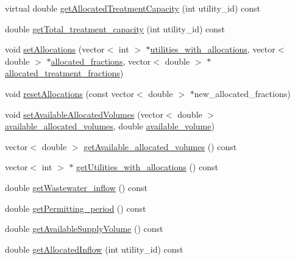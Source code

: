 \begin{DoxyCompactItemize}
\item 
virtual double \mbox{\hyperlink{classWaterSource_ab3ba86d2a3e864e435ba2b88cceea555}{get\+Allocated\+Treatment\+Capacity}} (int utility\+\_\+id) const
\item 
double \mbox{\hyperlink{classWaterSource_a6228c9aee407ca2544753dbd2792c5fb}{get\+Total\+\_\+treatment\+\_\+capacity}} (int utility\+\_\+id) const
\item 
void \mbox{\hyperlink{classWaterSource_ac834762e016e796968ad286feeca7be6}{set\+Allocations}} (vector$<$ int $>$ $\ast$\mbox{\hyperlink{classWaterSource_ac345583fc2d0f7e1db31ee40244d7ace}{utilities\+\_\+with\+\_\+allocations}}, vector$<$ double $>$ $\ast$\mbox{\hyperlink{classWaterSource_a2f6655a80c4847fe039987255d9d998c}{allocated\+\_\+fractions}}, vector$<$ double $>$ $\ast$\mbox{\hyperlink{classWaterSource_aa73fe10cfc6579b2fb79529e1dde5140}{allocated\+\_\+treatment\+\_\+fractions}})
\item 
void \mbox{\hyperlink{classWaterSource_af52f39412f0d761f7e3b3369ffdf90f1}{reset\+Allocations}} (const vector$<$ double $>$ $\ast$new\+\_\+allocated\+\_\+fractions)
\item 
void \mbox{\hyperlink{classWaterSource_ae29ed4aa2b9c97c5a41772daf4631f05}{set\+Available\+Allocated\+Volumes}} (vector$<$ double $>$ \mbox{\hyperlink{classWaterSource_a77d3fe9ea445fc987b07debdfb9e2f5b}{available\+\_\+allocated\+\_\+volumes}}, double \mbox{\hyperlink{classWaterSource_a49e1a191152e344e2161e8db166e067a}{available\+\_\+volume}})
\item 
vector$<$ double $>$ \mbox{\hyperlink{classWaterSource_a1087f5f2458803fd1d37383e303bd25f}{get\+Available\+\_\+allocated\+\_\+volumes}} () const
\item 
vector$<$ int $>$ $\ast$ \mbox{\hyperlink{classWaterSource_a7d6beb9fce5be21a3777fee88f045e62}{get\+Utilities\+\_\+with\+\_\+allocations}} () const
\item 
double \mbox{\hyperlink{classWaterSource_aee22325e6af0e3c804ddbd9a3505be05}{get\+Wastewater\+\_\+inflow}} () const
\item 
double \mbox{\hyperlink{classWaterSource_aa21d3f1c87ced40c2b673d9e43d99176}{get\+Permitting\+\_\+period}} () const
\item 
double \mbox{\hyperlink{classWaterSource_af6445a2dd3764907bcb9a37d4647f910}{get\+Available\+Supply\+Volume}} () const
\item 
double \mbox{\hyperlink{classWaterSource_a63b1a410b47710db049e2b2e9c3c39a0}{get\+Allocated\+Inflow}} (int utility\+\_\+id) const
\item 

\end{DoxyCompactItemize}
